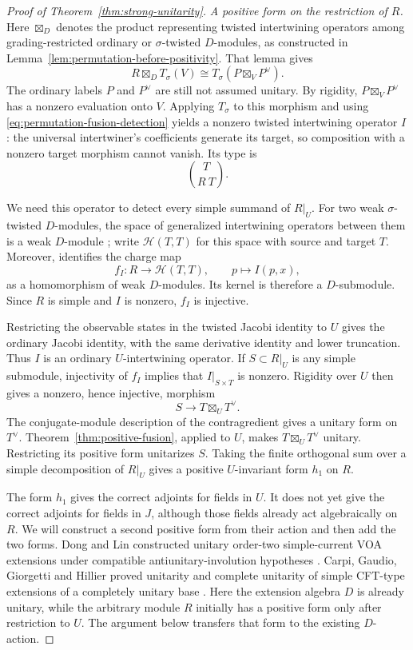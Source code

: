 \begin{proof}[Proof of Theorem~\ref{thm:strong-unitarity}]
\smallskip
\noindent\emph{A positive form on the restriction of $R$.}
Here $\boxtimes_D$ denotes the product representing twisted
intertwining operators among grading-restricted ordinary or
$\sigma$-twisted $D$-modules, as constructed in
Lemma~\ref{lem:permutation-before-positivity}. That lemma gives
\begin{equation}\label{eq:permutation-fusion-detection}
 R\boxtimes_D T_\sigma(V)
 \cong T_\sigma(P\boxtimes_V P^\vee).
\end{equation}
The ordinary labels $P$ and $P^\vee$ are still not assumed unitary.
By rigidity, $P\boxtimes_V P^\vee$ has a nonzero evaluation onto $V$.
Applying $T_\sigma$ to this morphism and using
\eqref{eq:permutation-fusion-detection} yields a nonzero twisted
intertwining operator $I$: the universal intertwiner's coefficients
generate its target, so composition with a nonzero target morphism
cannot vanish. Its type is
\[
 \binom{T}{R\ T}.
\]

We need this operator to detect every simple summand of $R|_U$.
For two weak $\sigma$-twisted $D$-modules, the space of generalized
intertwining operators between them is a weak $D$-module
\cite[Theorem~4.6]{DLXY}; write $\mathcal H(T,T)$ for this space with
source and target $T$. Moreover,
\cite[Proposition~4.8]{DLXY} identifies the charge map
\[
 f_I:R\longrightarrow\mathcal H(T,T),\qquad p\longmapsto I(p,x),
\]
as a homomorphism of weak $D$-modules. Its kernel is therefore a
$D$-submodule. Since $R$ is simple and $I$ is nonzero, $f_I$ is
injective.

Restricting the observable states in the twisted Jacobi identity to
$U$ gives the ordinary Jacobi identity, with the same derivative
identity and lower truncation. Thus $I$ is an ordinary
$U$-intertwining operator. If $S\subset R|_U$ is any simple submodule,
injectivity of $f_I$ implies that $I|_{S\times T}$ is nonzero.
Rigidity over $U$ then gives a nonzero, hence injective, morphism
\[
 S\longrightarrow T\boxtimes_U T^\vee.
\]
The conjugate-module description of the contragredient gives a unitary
form on $T^\vee$. Theorem~\ref{thm:positive-fusion}, applied to $U$,
makes $T\boxtimes_U T^\vee$ unitary. Restricting its positive form
unitarizes $S$. Taking the finite orthogonal sum over a simple
decomposition of $R|_U$ gives a positive $U$-invariant form $h_1$ on
$R$.

The form $h_1$ gives the correct adjoints for fields in $U$. It does
not yet give the correct adjoints for fields in $J$, although those
fields already act algebraically on $R$. We will construct a second
positive form from their action and then add the two forms.
Dong and Lin constructed unitary order-two simple-current VOA extensions
under compatible antiunitary-involution hypotheses
\cite[Theorem~3.3]{DongLin}.
Carpi, Gaudio, Giorgetti and Hillier proved unitarity and complete
unitarity of simple CFT-type extensions of a completely unitary base
\cite[Theorem~4.7]{CGGH}. Here the extension algebra $D$ is already
unitary, while the arbitrary module $R$ initially has a positive form
only after restriction to $U$. The argument below transfers that form
to the existing $D$-action.


\end{proof}
